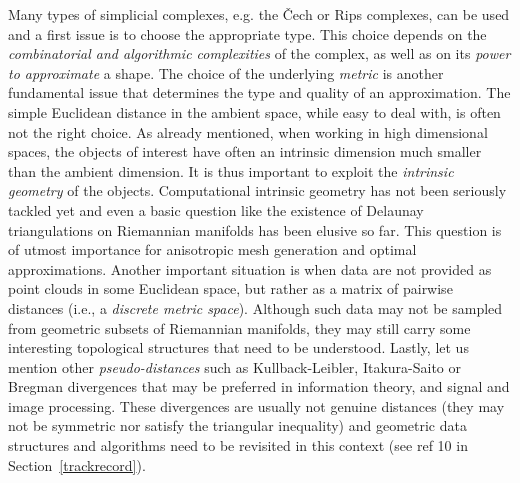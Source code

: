  Many types of simplicial complexes, e.g. the \v{C}ech  or Rips complexes, can be used and a first issue is to choose the appropriate type. This choice depends on the {\em combinatorial and algorithmic complexities} of the complex, as well as on its {\em power to approximate} a shape.
 The choice of the underlying {\em metric} %
 is another  fundamental issue 
that determines the type and quality of an approximation.
 The simple Euclidean distance in the ambient space, while easy to deal with, is often not the right choice.  As already mentioned, when working in high dimensional spaces, the objects of interest have often an intrinsic dimension much smaller than the ambient dimension. It is thus important to exploit the {\em intrinsic geometry} of the objects. Computational intrinsic geometry has not been seriously tackled yet and even a basic question like the existence of  Delaunay triangulations on Riemannian manifolds has been elusive so far.  This question is of utmost importance for anisotropic mesh generation and optimal approximations. Another important situation is when data are not provided as  point clouds in some Euclidean space, but rather as a matrix of pairwise distances (i.e., a {\em discrete metric space}). Although such data may not be sampled from geometric subsets of Riemannian manifolds, they may still carry some interesting topological structures that need to be understood. 
Lastly, let us mention other {\em pseudo-distances} such as
Kullback-Leibler, Itakura-Saito or Bregman divergences that may be
preferred in information theory, and signal and image processing.
 These divergences are usually not genuine distances (they may not be symmetric nor satisfy the triangular inequality) and  geometric data structures and algorithms need to be revisited in this context (see ref 10 in Section~\ref{trackrecord}).%


\vspace{-3mm}


